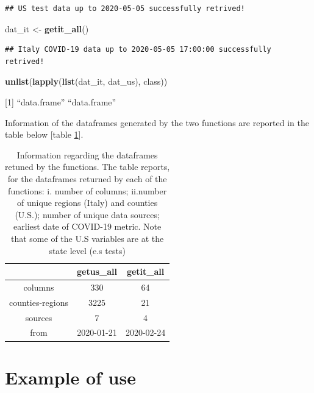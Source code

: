 \documentclass[12pt,halfline,a4paper,]{ouparticle}
\newenvironment{Shaded}{\begin{snugshade}}{\end{snugshade}}
\newcommand{\KeywordTok}[1]{\textcolor[rgb]{0.13,0.29,0.53}{\textbf{#1}}}
\newcommand{\NormalTok}[1]{#1}
\newcommand{\StringTok}[1]{\textcolor[rgb]{0.31,0.60,0.02}{#1}}
\begin{document}
\begin{verbatim}
## US test data up to 2020-05-05 successfully retrived!
\end{verbatim}

\begin{Shaded}
\begin{Highlighting}[]
\NormalTok{dat_it <-}\StringTok{ }\KeywordTok{getit_all}\NormalTok{()}
\end{Highlighting}
\end{Shaded}

\begin{verbatim}
## Italy COVID-19 data up to 2020-05-05 17:00:00 successfully retrived!
\end{verbatim}

\begin{Shaded}
\begin{Highlighting}[]
\KeywordTok{unlist}\NormalTok{(}\KeywordTok{lapply}\NormalTok{(}\KeywordTok{list}\NormalTok{(dat_it, dat_us), class))}
\end{Highlighting}
\end{Shaded}

{[}1{]} ``data.frame'' ``data.frame''

\bigskip

Information of the dataframes generated by the two functions are
reported in the table below {[}table \ref{tab:tab_dat}{]}.

\bigskip

\begin{table}[ht]
\centering
\begin{tabular}{ccc}
  \hline
 & getus\_all & getit\_all \\ 
  \hline
columns & 330 & 64 \\ 
  counties-regions & 3225 & 21 \\ 
  sources & 7 & 4 \\ 
  from & 2020-01-21 & 2020-02-24 \\ 
   \hline
\end{tabular}
\caption{Information regarding the dataframes retuned by the functions.
    The table reports, for the dataframes returned by each of the functions: i. number of columns; ii.number of unique regions (Italy) and counties (U.S.);  number of unique data sources; earliest date of COVID-19 metric. Note that some of 
    the U.S variables are at the state level (e.s tests)
    } 
\label{tab:tab_dat}
\end{table}

\hypertarget{example-of-use}{%
\section{Example of use}\label{example-of-use}}
\end{document}
